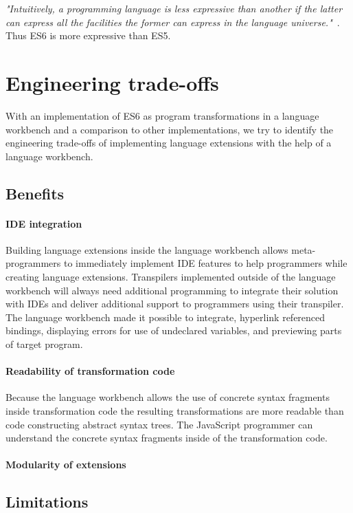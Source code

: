 \textit{"Intuitively, a programming language is less expressive than another if the latter can express all the facilities the former can express in the language universe."}~\cite{Felleisen1990}. Thus ES6 is more expressive than ES5.

\section{Engineering trade-offs}

With an implementation of ES6 as program transformations in a language workbench and a comparison to other implementations, we try to identify the engineering trade-offs of implementing language extensions with the help of a language workbench.

\subsection{Benefits}

\paragraph{IDE integration}
Building language extensions inside the language workbench allows meta-programmers to immediately implement IDE features to help programmers while creating language extensions. Transpilers implemented outside of the language workbench will always need additional programming to integrate their solution with IDEs and deliver additional support to programmers using their transpiler. The language workbench made it possible to integrate, hyperlink referenced bindings, displaying errors for use of undeclared variables, and previewing parts of target program. 

\paragraph{Readability of transformation code}
Because the language workbench allows the use of concrete syntax fragments inside transformation code the resulting transformations are more readable than code constructing abstract syntax trees. The JavaScript programmer can understand the concrete syntax fragments inside of the transformation code.

\paragraph{Modularity of extensions}

\subsection{Limitations}


